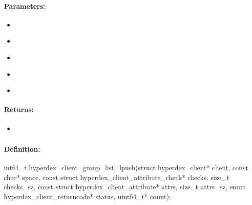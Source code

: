 \paragraph{Parameters:}
\begin{itemize}[noitemsep]
\item {}\\

\item {}\\

\item {}\\

\item {}\\

\item {}\\

\end{itemize}

\paragraph{Returns:}
\begin{itemize}[noitemsep]
\item {}\\

\end{itemize}

\pagebreak
\subsubsection{}
\label{api:c:group_list_lpush}


\paragraph{Definition:}
\begin{ccode}
int64_t hyperdex_client_group_list_lpush(struct hyperdex_client* client,
        const char* space,
        const struct hyperdex_client_attribute_check* checks, size_t checks_sz,
        const struct hyperdex_client_attribute* attrs, size_t attrs_sz,
        enum hyperdex_client_returncode* status,
        uint64_t* count);
\end{ccode}

